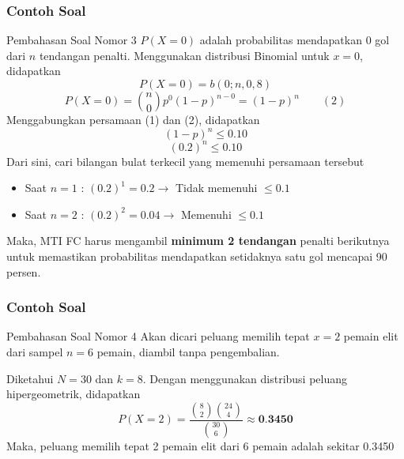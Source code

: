 \documentclass[]{beamer}
\begin{document}
\begin{frame}
    \frametitle{Contoh Soal}
    \scriptsize
    \begin{exampleblock}{Pembahasan Soal Nomor 3}
    $P(X=0)$ adalah probabilitas mendapatkan 0 gol dari $n$ tendangan penalti. Menggunakan distribusi Binomial untuk $x=0$, didapatkan
    \begin{equation*}
        P(X=0)=b(0;n,0,8)
    \end{equation*}
    \begin{equation*}
        P(X=0) = \binom{n}{0} p^0 (1-p)^{n-0} = (1-p)^n \qquad (2)
    \end{equation*}
    Menggabungkan persamaan (1) dan (2), didapatkan
    \begin{equation*}
        (1-p)^n \le 0.10
    \end{equation*}
    \begin{equation*}
        (0.2)^n \le 0.10
    \end{equation*}
    Dari sini, cari bilangan bulat terkecil yang memenuhi persamaan tersebut
    \begin{itemize}
        \item Saat $n=1$ : $(0.2)^1 = 0.2\longrightarrow$ Tidak memenuhi $\le 0.1$
        \item Saat $n=2$ : $(0.2)^2 = 0.04\longrightarrow$ Memenuhi $\le 0.1$
    \end{itemize}

    \bigskip
    Maka, MTI FC harus mengambil \textbf{minimum 2 tendangan} penalti berikutnya untuk memastikan probabilitas mendapatkan setidaknya satu gol mencapai 90 persen.
    \end{exampleblock}
\end{frame}

\begin{frame}
    \frametitle{Contoh Soal}
    \scriptsize
    \begin{exampleblock}{Pembahasan Soal Nomor 4}
    Akan dicari peluang memilih tepat $x=2$ pemain elit dari sampel $n=6$ pemain, diambil tanpa pengembalian.

    Diketahui $N = 30$ dan $k=8$. Dengan menggunakan distribusi peluang hipergeometrik, didapatkan
    \begin{equation*}
        P(X=2) = \frac{\binom{8}{2} \binom{24}{4}}{\binom{30}{6}} \approx \textbf{0.3450}
    \end{equation*}
    Maka, peluang memilih tepat 2 pemain elit dari 6 pemain adalah sekitar 0.3450
    \end{exampleblock}
\end{frame}
\end{document}
